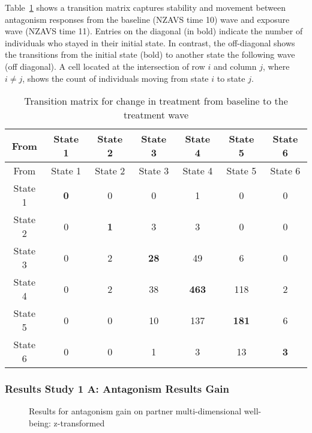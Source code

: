 \documentclass[
  singlecolumn]{article}
\begin{document}
Table~\ref{tbl-transition-antagonism} shows a transition matrix captures
stability and movement between antagonism responses from the baseline
(NZAVS time 10) wave and exposure wave (NZAVS time 11). Entries on the
diagonal (in bold) indicate the number of individuals who stayed in
their initial state. In contrast, the off-diagonal shows the transitions
from the initial state (bold) to another state the following wave (off
diagonal). A cell located at the intersection of row \(i\) and column
\(j\), where \(i \neq j\), shows the count of individuals moving from
state \(i\) to state \(j\).

\begin{longtable}[]{@{}ccccccc@{}}
\caption{Transition matrix for change in treatment from baseline to the
treatment wave}\label{tbl-transition-antagonism}\tabularnewline
\toprule\noalign{}
From & State 1 & State 2 & State 3 & State 4 & State 5 & State 6 \\
\midrule\noalign{}
\endfirsthead
\toprule\noalign{}
From & State 1 & State 2 & State 3 & State 4 & State 5 & State 6 \\
\midrule\noalign{}
\endhead
\bottomrule\noalign{}
\endlastfoot
State 1 & \textbf{0} & 0 & 0 & 1 & 0 & 0 \\
State 2 & 0 & \textbf{1} & 3 & 3 & 0 & 0 \\
State 3 & 0 & 2 & \textbf{28} & 49 & 6 & 0 \\
State 4 & 0 & 2 & 38 & \textbf{463} & 118 & 2 \\
State 5 & 0 & 0 & 10 & 137 & \textbf{181} & 6 \\
State 6 & 0 & 0 & 1 & 3 & 13 & \textbf{3} \\
\end{longtable}

\subsubsection{Results Study 1 A: Antagonism Results
Gain}\label{results-study-1-a-antagonism-results-gain}

\begin{figure}


\caption{\label{fig-results-antagonism-gain}Results for antagonism gain
on partner multi-dimensional well-being: z-transformed}

\end{figure}%
\end{document}
